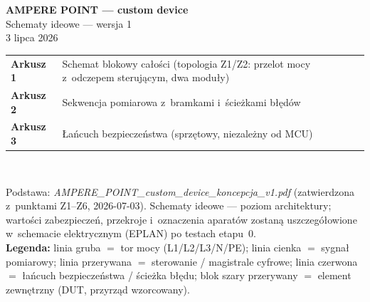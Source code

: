 \documentclass[10pt,a4paper,landscape]{article}
\begin{document}
\begin{center}
\vspace*{2.5cm}
{\LARGE\bfseries AMPERE POINT --- custom device}\\[6pt]
{\Large Schematy ideowe --- wersja 1}\\[14pt]
{\normalsize 3 lipca 2026}\\[22pt]
\begin{tabular}{ll}
\textbf{Arkusz 1} & Schemat blokowy całości (topologia Z1/Z2: przelot mocy z~odczepem sterującym, dwa moduły)\\[2pt]
\textbf{Arkusz 2} & Sekwencja pomiarowa z~bramkami i~ścieżkami błędów\\[2pt]
\textbf{Arkusz 3} & Łańcuch bezpieczeństwa (sprzętowy, niezależny od MCU)\\
\end{tabular}\\[20pt]
\begin{minipage}{0.72\textwidth}\small
Podstawa: \emph{AMPERE\_POINT\_custom\_device\_koncepcja\_v1.pdf} (zatwierdzona z~punktami Z1--Z6, 2026-07-03).
Schematy ideowe --- poziom architektury; wartości zabezpieczeń, przekroje i~oznaczenia aparatów zostaną
uszczegółowione w~schemacie elektrycznym (EPLAN) po testach etapu~0.\\[6pt]
\textbf{Legenda:} linia gruba $=$ tor mocy (L1/L2/L3/N/PE); linia cienka $=$ sygnał pomiarowy;
linia przerywana $=$ sterowanie / magistrale cyfrowe; linia czerwona $=$ łańcuch bezpieczeństwa /
ścieżka błędu; blok szary przerywany $=$ element zewnętrzny (DUT, przyrząd wzorcowany).
\end{minipage}
\end{center}
\newpage
\end{document}
